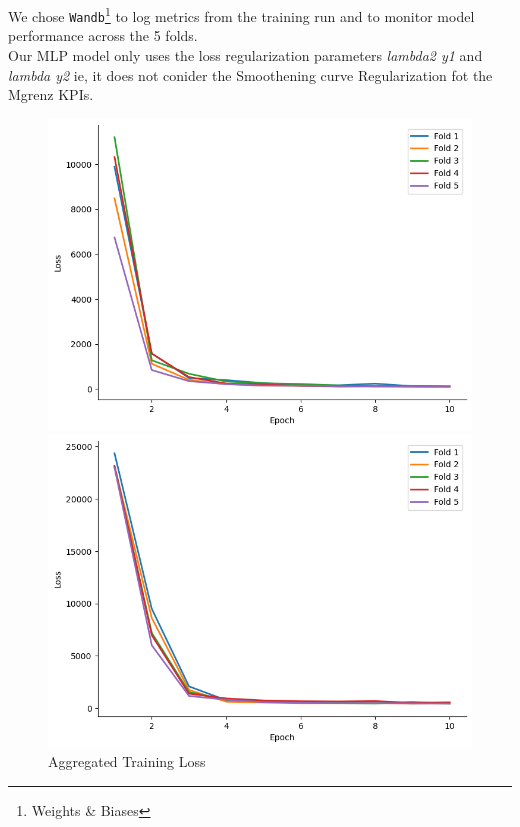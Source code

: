 \documentclass{report} %
\begin{document}
We chose \texttt{Wandb}\footnote{Weights \& Biases} to log metrics from the training run and to monitor model performance across the 5 folds. \\
Our \ac{MLP} model only uses the loss regularization parameters \textit{lambda2 y1} and \textit{lambda y2} ie, it does not conider the Smoothening curve Regularization fot the Mgrenz \ac{KPI}s.
\begin{figure}[H]
    \centering
    \begin{minipage}[b]{0.325\textwidth}
        \includegraphics[width=\textwidth]{./ReportImages/train_loss.png}
        \caption{\centering Aggregated Training Loss}
        \label{fig:Aggregated Training Loss}
    \end{minipage}
    \hfill
    \begin{minipage}[b]{0.325\textwidth}
        \includegraphics[width=\textwidth]{./ReportImages/train_loss_y1.png}

\end{minipage}
\end{figure}
\end{document}
